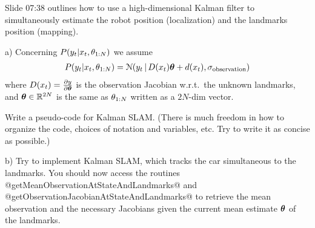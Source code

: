 

\renewcommand{\course}{Robotics}
\renewcommand{\coursepicture}{roboticsLecture}
\renewcommand{\coursedate}{Winter 2014}
\renewcommand{\exnum}{extra}

\exercises


\exercisestitle



Slide 07:38 outlines how to use a high-dimensional Kalman
filter to simultaneously estimate the robot position (localization)
and the landmarks position (mapping).

a) Concerning $P(y_t | x_t, \theta_{1:N})$ we assume
\begin{align*}
P(y_t | x_t, \theta_{1:N}) = {\cal N}(y_t \,|\, D(x_t) \boldsymbol{\theta} + d(x_t), \sigma_\text{observation})
\end{align*}
where $D(x_t)=\frac{\partial y}{\partial \boldsymbol{\theta}}$ is the observation Jacobian
w.r.t.\ the unknown landmarks, and $\boldsymbol{\theta}\in{\mathbb{R}}^{2N}$ is the same as
$\theta_{1:N}$ written as a $2N$-dim vector.

Write a pseudo-code for Kalman SLAM. (There is much freedom in
how to organize the code, choices of notation and variables, etc. Try to
write it as concise as possible.)


b) Try to implement Kalman SLAM, which tracks the car simultaneous to the
landmarks. You should now access the
routines @getMeanObservationAtStateAndLandmarks@ and
@getObservationJacobianAtStateAndLandmarks@ to retrieve the
mean observation and the necessary Jacobians given the current
mean estimate $\boldsymbol{\theta}$ of the landmarks.

\exerfoot




